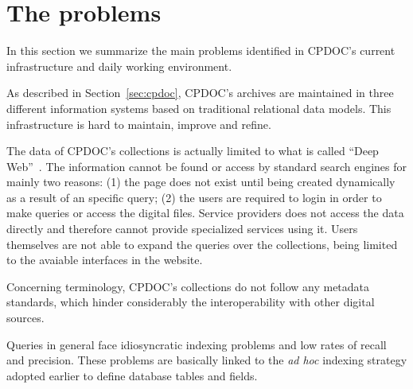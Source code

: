 
\section{The problems}\label{sec:problems}

In this section we summarize the main problems identified in CPDOC's
current infrastructure and daily working environment.

As described in Section~\ref{sec:cpdoc}, CPDOC's archives are
maintained in three different information systems based on traditional
relational data models. This infrastructure is hard to maintain,
improve and refine. 


The data of CPDOC's collections  is
actually limited to what is called ``Deep
Web''~\cite{bergman2001white}. The information cannot be found or
access by standard search engines for mainly two reasons: (1) the page
does not exist until being created dynamically as a result of an
specific query; (2) the users are required to login in order to make
queries or access the digital files. Service providers does not access
the data directly and therefore cannot provide specialized services
using it. Users themselves are not able to expand the queries
over the collections, being limited to the avaiable interfaces in the website.

Concerning terminology, CPDOC's collections do not follow any metadata
standards, which hinder considerably the interoperability with other
digital sources.

Queries in general face idiosyncratic indexing
problems and low rates of recall and precision. These problems are
basically linked to the \emph{ad hoc} indexing strategy adopted
earlier to define database tables and fields.

